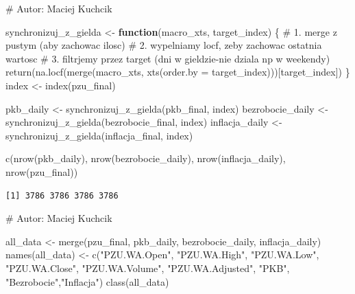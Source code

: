 \documentclass[
  polish,
  letterpaper,
  DIV=11,
  numbers=noendperiod]{scrartcl}
\newenvironment{Shaded}{\begin{snugshade}}{\end{snugshade}}
\newcommand{\AttributeTok}[1]{\textcolor[rgb]{0.40,0.45,0.13}{#1}}
\newcommand{\CommentTok}[1]{\textcolor[rgb]{0.37,0.37,0.37}{#1}}
\newcommand{\ControlFlowTok}[1]{\textcolor[rgb]{0.00,0.23,0.31}{\textbf{#1}}}
\newcommand{\FunctionTok}[1]{\textcolor[rgb]{0.28,0.35,0.67}{#1}}
\newcommand{\NormalTok}[1]{\textcolor[rgb]{0.00,0.23,0.31}{#1}}
\newcommand{\OtherTok}[1]{\textcolor[rgb]{0.00,0.23,0.31}{#1}}
\newcommand{\StringTok}[1]{\textcolor[rgb]{0.13,0.47,0.30}{#1}}
\begin{document}
\begin{Shaded}
\begin{Highlighting}[]
\CommentTok{\# Autor: Maciej Kuchcik}

\NormalTok{synchronizuj\_z\_gielda }\OtherTok{\textless{}{-}} \ControlFlowTok{function}\NormalTok{(macro\_xts, target\_index) \{}
  \CommentTok{\# 1. merge z pustym (aby zachowac ilosc)}
  \CommentTok{\# 2. wypelniamy locf, zeby zachowac ostatnia wartosc}
  \CommentTok{\# 3. filtrjemy przez target (dni w gieldzie{-}nie dziala np w weekendy)}
  \FunctionTok{return}\NormalTok{(}\FunctionTok{na.locf}\NormalTok{(}\FunctionTok{merge}\NormalTok{(macro\_xts, }\FunctionTok{xts}\NormalTok{(}\AttributeTok{order.by =}\NormalTok{ target\_index)))[target\_index])}
\NormalTok{\}}
\NormalTok{index }\OtherTok{\textless{}{-}} \FunctionTok{index}\NormalTok{(pzu\_final)}

\NormalTok{pkb\_daily        }\OtherTok{\textless{}{-}} \FunctionTok{synchronizuj\_z\_gielda}\NormalTok{(pkb\_final, index)}
\NormalTok{bezrobocie\_daily }\OtherTok{\textless{}{-}} \FunctionTok{synchronizuj\_z\_gielda}\NormalTok{(bezrobocie\_final, index)}
\NormalTok{inflacja\_daily   }\OtherTok{\textless{}{-}} \FunctionTok{synchronizuj\_z\_gielda}\NormalTok{(inflacja\_final, index)}

\FunctionTok{c}\NormalTok{(}\FunctionTok{nrow}\NormalTok{(pkb\_daily), }\FunctionTok{nrow}\NormalTok{(bezrobocie\_daily), }
  \FunctionTok{nrow}\NormalTok{(inflacja\_daily), }\FunctionTok{nrow}\NormalTok{(pzu\_final))}
\end{Highlighting}
\end{Shaded}

\begin{verbatim}
[1] 3786 3786 3786 3786
\end{verbatim}

\begin{Shaded}
\begin{Highlighting}[]
\CommentTok{\# Autor: Maciej Kuchcik}

\NormalTok{all\_data }\OtherTok{\textless{}{-}} \FunctionTok{merge}\NormalTok{(pzu\_final, pkb\_daily, bezrobocie\_daily, inflacja\_daily)}
\FunctionTok{names}\NormalTok{(all\_data) }\OtherTok{\textless{}{-}} \FunctionTok{c}\NormalTok{(}\StringTok{"PZU.WA.Open"}\NormalTok{, }\StringTok{"PZU.WA.High"}\NormalTok{, }\StringTok{"PZU.WA.Low"}\NormalTok{, }
                     \StringTok{"PZU.WA.Close"}\NormalTok{, }\StringTok{"PZU.WA.Volume"}\NormalTok{, }\StringTok{"PZU.WA.Adjusted"}\NormalTok{, }
                     \StringTok{"PKB"}\NormalTok{, }\StringTok{"Bezrobocie"}\NormalTok{,}\StringTok{"Inflacja"}\NormalTok{)}
\FunctionTok{class}\NormalTok{(all\_data)}
\end{Highlighting}
\end{Shaded}
\end{document}
